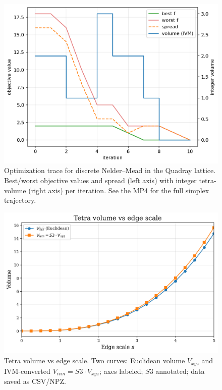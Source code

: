 \documentclass[
]{article}
\begin{document}
\begin{figure}
\hypertarget{fig:simplex_trace}{%
\centering
\includegraphics{../output/figures/simplex_trace.png}
\caption{Optimization trace for discrete Nelder--Mead in the Quadray
lattice. Best/worst objective values and spread (left axis) with integer
tetra-volume (right axis) per iteration. See the MP4 for the full
simplex trajectory.}\label{fig:simplex_trace}
}
\end{figure}

\begin{figure}
\hypertarget{fig:volumes_scale}{%
\centering
\includegraphics{../output/figures/volumes_scale_plot.png}
\caption{Tetra volume vs edge scale. Two curves: Euclidean volume
\(V_{xyz}\) and IVM-converted \(V_{ivm}=S3\cdot V_{xyz}\); axes labeled;
\(S3\) annotated; data saved as CSV/NPZ.}\label{fig:volumes_scale}
}
\end{figure}
\end{document}
